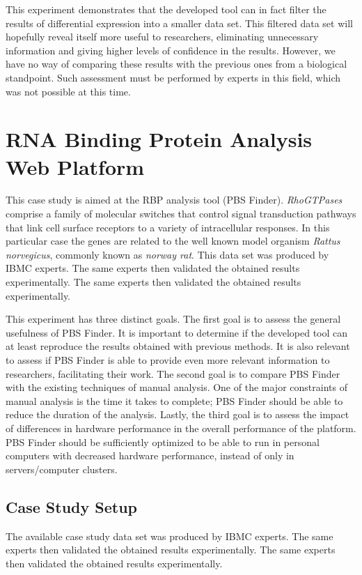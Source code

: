This experiment demonstrates that the developed tool can in fact filter the
results of differential expression into a smaller data set. This filtered data
set will hopefully reveal itself more useful to researchers, eliminating
unnecessary information and giving higher levels of confidence in the results.
However, we have no way of comparing these results with the previous ones from a
biological standpoint. Such assessment must be performed by experts in this
field, which was not possible at this time.

\section{RNA Binding Protein Analysis Web Platform}

This case study is aimed at the RBP analysis tool (PBS Finder).
\emph{RhoGTPases} comprise a family of molecular switches that control signal
transduction pathways that link cell surface receptors to a variety of
intracellular responses. In this particular case the genes are related to the
well known model organism \emph{Rattus norvegicus}, commonly known as
\emph{norway rat}. This data set was produced by IBMC experts. The same experts
then validated the obtained results experimentally. The same experts then
validated the obtained results experimentally.

This experiment has three distinct goals. The first goal is to assess the
general usefulness of PBS Finder. It is important to determine if the developed
tool can at least reproduce the results obtained with previous methods. It is
also relevant to assess if PBS Finder is able to provide even more relevant
information to researchers, facilitating their work. The second goal is to
compare PBS Finder with the existing techniques of manual analysis. One of the
major constraints of manual analysis is the time it takes to complete; PBS
Finder should be able to reduce the duration of the analysis. Lastly, the third
goal is to assess the impact of differences in hardware performance in the
overall performance of the platform. PBS Finder should be sufficiently optimized
to be able to run in personal computers with decreased hardware performance,
instead of only in servers/computer clusters.

\subsection{Case Study Setup}

The available case study data set was produced by IBMC experts. The same experts
then validated the obtained results experimentally. The same experts then
validated the obtained results experimentally.

